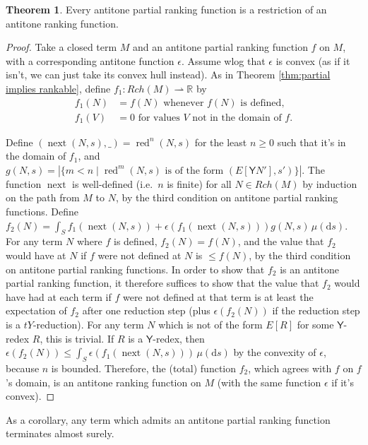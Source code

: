 \documentclass{article}
\newcommand{\tY}{\mathsf{Y}}
\DeclareMathOperator{\red}{red}
\DeclareMathOperator{\nnext}{next}
\theoremstyle{definition}
\theoremstyle{lemma}
\newtheorem{theorem}{Theorem}
\theoremstyle{remark}
\begin{document}
\begin{theorem}  \label{thm:antitone partial implies rankable}
  Every antitone partial ranking function is a restriction of an antitone ranking function.
\end{theorem}
\begin{proof}
  Take a closed term $M$ and an antitone partial ranking function $f$ on $M$, with a corresponding antitone function $\epsilon$. Assume wlog that $\epsilon$ is convex (as if it isn't, we can just take its convex hull instead). As in Theorem \ref{thm:partial implies rankable}, define $f_1 : Rch(M) \rightharpoonup \mathbb R$ by
  \begin{align*}
    f_1(N) &= f(N) \text{ whenever $f(N)$ is defined},\\
    f_1(V) &= 0 \text{ for values $V$ not in the domain of $f$.}
  \end{align*}

  Define $(\nnext(N,s),\_) = \red^n(N,s)$ for the least $n \geq 0$ such that it's in the domain of $f_1$, and $g(N,s) = \left | \{m < n \mid \red^m(N,s) \text{ is of the form } (E[\tY N'],s') \} \right |$. 
  The function $\nnext$ is well-defined (i.e.~$n$ is finite) for all $N \in Rch(M)$ by induction on the path from $M$ to $N$, by the third condition on antitone partial ranking functions. Define $f_2(N) = \int_S f_1(\nnext(N,s)) + \epsilon(f_1(\nnext(N,s))) g(N,s) \, \mu(\mathrm d s)$. For any term $N$ where $f$ is defined, $f_2(N) = f(N)$, and the value that $f_2$ would have at $N$ if $f$ were not defined at $N$ is $\leq f(N)$, by the third condition on antitone partial ranking functions. In order to show that $f_2$ is an antitone partial ranking function, it therefore suffices to show that the value that $f_2$ would have had at each term if $f$ were not defined at that term is at least the expectation of $f_2$ after one reduction step (plus $\epsilon(f_2(N))$ if the reduction step is a $tY$-reduction). For any term $N$ which is not of the form $E[R]$ for some $\tY$-redex $R$, this is trivial. If $R$ is a $\tY$-redex, then $\epsilon(f_2(N)) \leq \int_S \epsilon(f_1(\nnext(N,s)))\, \mu(\mathrm d s)$ by the convexity of $\epsilon$, because $n$ is bounded. Therefore, the (total) function $f_2$, which agrees with $f$ on $f$'s domain, is an antitone ranking function on $M$ (with the same function $\epsilon$ if it's convex).
\end{proof}

As a corollary, any term which admits an antitone partial ranking function terminates almost surely.
\end{document}
